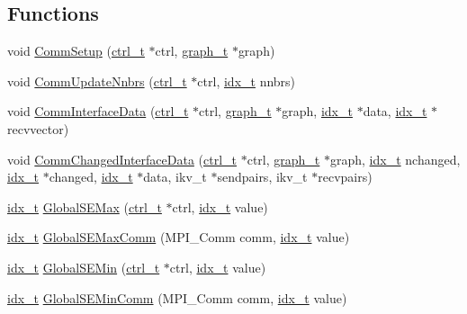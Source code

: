 \subsection*{Functions}
\begin{DoxyCompactItemize}
\item 
void \hyperlink{a00344_ab7b157ae46e347049d624027324316a0}{Comm\+Setup} (\hyperlink{a00742}{ctrl\+\_\+t} $\ast$ctrl, \hyperlink{a00734}{graph\+\_\+t} $\ast$graph)
\item 
void \hyperlink{a00344_a245110080c4fe1712c5cac4a52e61e69}{Comm\+Update\+Nnbrs} (\hyperlink{a00742}{ctrl\+\_\+t} $\ast$ctrl, \hyperlink{a00876_aaa5262be3e700770163401acb0150f52}{idx\+\_\+t} nnbrs)
\item 
void \hyperlink{a00344_a4ea1863ed9e161bc82ff3c6f0ff431c9}{Comm\+Interface\+Data} (\hyperlink{a00742}{ctrl\+\_\+t} $\ast$ctrl, \hyperlink{a00734}{graph\+\_\+t} $\ast$graph, \hyperlink{a00876_aaa5262be3e700770163401acb0150f52}{idx\+\_\+t} $\ast$data, \hyperlink{a00876_aaa5262be3e700770163401acb0150f52}{idx\+\_\+t} $\ast$recvvector)
\item 
void \hyperlink{a00344_adc12fed8c165f50572b6704789b0a962}{Comm\+Changed\+Interface\+Data} (\hyperlink{a00742}{ctrl\+\_\+t} $\ast$ctrl, \hyperlink{a00734}{graph\+\_\+t} $\ast$graph, \hyperlink{a00876_aaa5262be3e700770163401acb0150f52}{idx\+\_\+t} nchanged, \hyperlink{a00876_aaa5262be3e700770163401acb0150f52}{idx\+\_\+t} $\ast$changed, \hyperlink{a00876_aaa5262be3e700770163401acb0150f52}{idx\+\_\+t} $\ast$data, ikv\+\_\+t $\ast$sendpairs, ikv\+\_\+t $\ast$recvpairs)
\item 
\hyperlink{a00876_aaa5262be3e700770163401acb0150f52}{idx\+\_\+t} \hyperlink{a00344_a51be32add0e43ecdac3f0b982a0733b4}{Global\+S\+E\+Max} (\hyperlink{a00742}{ctrl\+\_\+t} $\ast$ctrl, \hyperlink{a00876_aaa5262be3e700770163401acb0150f52}{idx\+\_\+t} value)
\item 
\hyperlink{a00876_aaa5262be3e700770163401acb0150f52}{idx\+\_\+t} \hyperlink{a00344_aa31576794c6d7b00495b4402a1a4814a}{Global\+S\+E\+Max\+Comm} (M\+P\+I\+\_\+\+Comm comm, \hyperlink{a00876_aaa5262be3e700770163401acb0150f52}{idx\+\_\+t} value)
\item 
\hyperlink{a00876_aaa5262be3e700770163401acb0150f52}{idx\+\_\+t} \hyperlink{a00344_a7cffea998f35ba1b59fe0726bee38fc9}{Global\+S\+E\+Min} (\hyperlink{a00742}{ctrl\+\_\+t} $\ast$ctrl, \hyperlink{a00876_aaa5262be3e700770163401acb0150f52}{idx\+\_\+t} value)
\item 
\hyperlink{a00876_aaa5262be3e700770163401acb0150f52}{idx\+\_\+t} \hyperlink{a00344_a44bc5168b7fcc675e4e07293a712f12b}{Global\+S\+E\+Min\+Comm} (M\+P\+I\+\_\+\+Comm comm, \hyperlink{a00876_aaa5262be3e700770163401acb0150f52}{idx\+\_\+t} value)

\end{DoxyCompactItemize}
